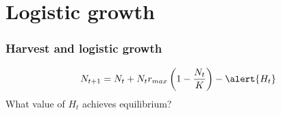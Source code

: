 \documentclass[color=usenames,dvipsnames,handout]{beamer}\usepackage[]{graphicx}\usepackage[]{color}
\begin{document}
\section{Logistic growth}







\begin{frame}
  \frametitle{Harvest and logistic growth}
  \LARGE
  \[
    N_{t+1} = N_t + N_t r_{max}\left(1 - \frac{N_t}{K} \right) - \alert{H_t}
  \]
  \pause
  \vfill
  \Large
  \centering %
  What value of $H_t$ achieves equilibrium? \\
\end{frame}
\end{document}
